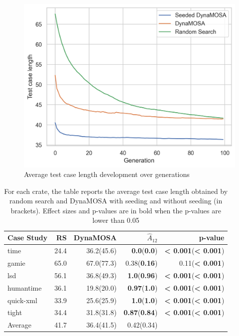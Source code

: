 \documentclass[paper=a4,%
  twoside,%
  BCOR4mm,%
  abstract=true,%
  toc=bibliography,%
  chapterprefix=true,%
  toc=bibliographynumbered,%
  open=right,%
  english,%
  pagesize=pdftex]{scrreprt}
\begin{document}
\begin{figure}[ht]
\caption{\label{fig:length-over-time}Average test case length development over generations}
\centering
\includegraphics[width=\textwidth]{experiments/length-over-time-crates}
\end{figure}


\begin{table}[]
\begin{tabular*}{\textwidth}{l @{\extracolsep{\fill}} rrrr}
\hline
\textbf{Case Study} & RS & DynaMOSA & \textbf{$\hat{A}_{12}$} & p-value \\
\hline
time & 24.4 & 36.2(45.6) & \textbf{0.0}(\textbf{0.0}) & \textbf{< 0.001}(\textbf{< 0.001}) \\
gamie & 65.0 & 67.0(77.3) & 0.38(\textbf{0.16}) & 0.11(\textbf{< 0.001}) \\
lsd & 56.1 & 36.8(49.3) & \textbf{1.0}(\textbf{0.96}) & \textbf{< 0.001}(\textbf{< 0.001}) \\
humantime & 36.1 & 19.8(20.0) & \textbf{0.97}(\textbf{1.0}) & \textbf{< 0.001}(\textbf{< 0.001}) \\
quick-xml & 33.9 & 25.6(25.9) & \textbf{1.0}(\textbf{1.0}) & \textbf{< 0.001}(\textbf{< 0.001}) \\
tight & 34.4 & 31.8(31.8) & \textbf{0.87}(\textbf{0.84}) & \textbf{< 0.001}(\textbf{< 0.001}) \\
\hline
Average & 41.7 & 36.4(41.5) & 0.42(0.34) & \\
\hline
\end{tabular*}
\caption{\label{tab:length-table}For each crate, the table reports the average test case length obtained by random search and DynaMOSA with seeding and without seeding (in brackets). Effect sizes and p-values are in bold when the p-values are lower than 0.05}
\end{table}
\end{document}
